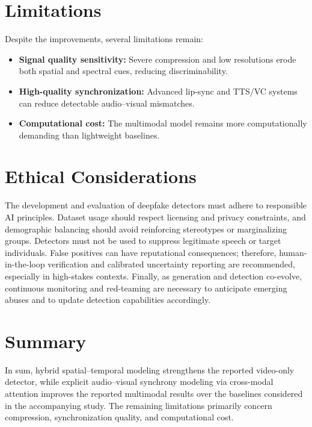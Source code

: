 \section{Limitations}
Despite the improvements, several limitations remain:
\begin{itemize}
    \item \textbf{Signal quality sensitivity:} Severe compression and low resolutions erode both spatial and spectral cues, reducing discriminability.
    \item \textbf{High-quality synchronization:} Advanced lip-sync and TTS/VC systems can reduce detectable audio--visual mismatches.
    \item \textbf{Computational cost:} The multimodal model remains more computationally demanding than lightweight baselines.
\end{itemize}

\section{Ethical Considerations}
The development and evaluation of deepfake detectors must adhere to responsible AI principles. Dataset usage should respect licensing and privacy constraints, and demographic balancing should avoid reinforcing stereotypes or marginalizing groups. Detectors must not be used to suppress legitimate speech or target individuals. False positives can have reputational consequences; therefore, human-in-the-loop verification and calibrated uncertainty reporting are recommended, especially in high-stakes contexts. Finally, as generation and detection co-evolve, continuous monitoring and red-teaming are necessary to anticipate emerging abuses and to update detection capabilities accordingly.

\section{Summary}
In sum, hybrid spatial--temporal modeling strengthens the reported video-only detector, while explicit audio--visual synchrony modeling via cross-modal attention improves the reported multimodal results over the baselines considered in the accompanying study. The remaining limitations primarily concern compression, synchronization quality, and computational cost.